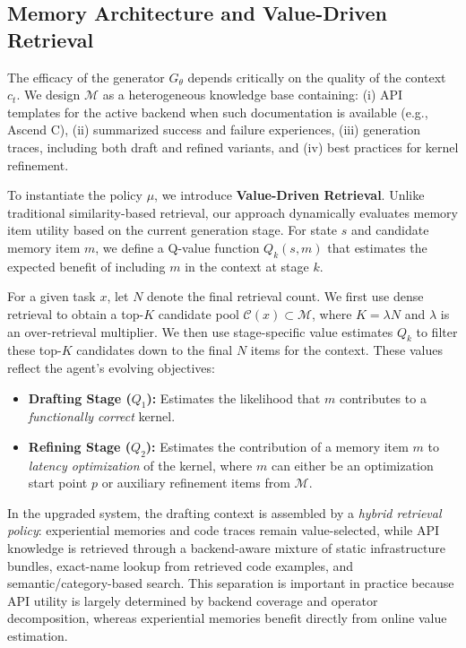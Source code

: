 \documentclass{article} %
\theoremstyle{definition}
\theoremstyle{remark}
\begin{document}
\subsection{Memory Architecture and Value-Driven Retrieval}
\label{sec:memory_value}
The efficacy of the generator $G_\theta$ depends critically on the quality of the context $c_t$. We design $\mathcal{M}$ as a heterogeneous knowledge base containing: 
(i) API templates for the active backend when such documentation is available (e.g., Ascend C),
(ii) summarized success and failure experiences,
(iii) generation traces, including both draft and refined variants, and
(iv) best practices for kernel refinement.

To instantiate the policy $\mu$, we introduce \textbf{Value-Driven Retrieval}. Unlike traditional similarity-based retrieval, our approach dynamically evaluates memory item utility based on the current generation stage. For state $s$ and candidate memory item $m$, we define a Q-value function $Q_k(s, m)$ that estimates the expected benefit of including $m$ in the context at stage $k$.


For a given task $x$, let $N$ denote the final retrieval count. We first use dense retrieval to obtain a top-$K$ candidate pool $\mathcal{C}(x) \subset \mathcal{M}$, where $K=\lambda N$ and $\lambda$ is an over-retrieval multiplier. We then use stage-specific value estimates $Q_k$ to filter these top-$K$ candidates down to the final $N$ items for the context. These values reflect the agent's evolving objectives:
\begin{itemize}
\item \textbf{Drafting Stage ($Q_1$):} Estimates the likelihood that $m$ contributes to a \emph{functionally correct} kernel.
\item \textbf{Refining Stage ($Q_2$):} Estimates the contribution of a memory item $m$ to \emph{latency optimization} of the kernel, where $m$ can either be an optimization start point $p$ or auxiliary refinement items from $\mathcal{M}$.
\end{itemize}

In the upgraded system, the drafting context is assembled by a \emph{hybrid retrieval policy}: experiential memories and code traces remain value-selected, while API knowledge is retrieved through a backend-aware mixture of static infrastructure bundles, exact-name lookup from retrieved code examples, and semantic/category-based search. This separation is important in practice because API utility is largely determined by backend coverage and operator decomposition, whereas experiential memories benefit directly from online value estimation.
\end{document}
